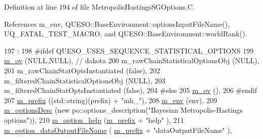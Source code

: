 Definition at line 194 of file Metropolis\-Hastings\-S\-G\-Options.\-C.



References m\-\_\-env, Q\-U\-E\-S\-O\-::\-Base\-Environment\-::options\-Input\-File\-Name(), U\-Q\-\_\-\-F\-A\-T\-A\-L\-\_\-\-T\-E\-S\-T\-\_\-\-M\-A\-C\-R\-O, and Q\-U\-E\-S\-O\-::\-Base\-Environment\-::world\-Rank().


\begin{DoxyCode}
197   :
198 \textcolor{preprocessor}{#ifdef QUESO\_USES\_SEQUENCE\_STATISTICAL\_OPTIONS}
199 \textcolor{preprocessor}{}  \hyperlink{class_q_u_e_s_o_1_1_metropolis_hastings_s_g_options_a9d4792d9fc2dc5439b8ab489b0c236eb}{m\_ov}                                               (NULL,NULL), \textcolor{comment}{// dakota}
200   m\_rawChainStatisticalOptionsObj                    (NULL),
201   m\_rawChainStatOptsInstantiated                     (\textcolor{keyword}{false}),
202   m\_filteredChainStatisticalOptionsObj               (NULL),
203   m\_filteredChainStatOptsInstantiated                (\textcolor{keyword}{false}),
204 \textcolor{preprocessor}{#else}
205 \textcolor{preprocessor}{}  \hyperlink{class_q_u_e_s_o_1_1_metropolis_hastings_s_g_options_a9d4792d9fc2dc5439b8ab489b0c236eb}{m\_ov}                                               (),
206 \textcolor{preprocessor}{#endif}
207 \textcolor{preprocessor}{}  \hyperlink{class_q_u_e_s_o_1_1_metropolis_hastings_s_g_options_a4f7c510aaa530336d24259e2a89f5d0b}{m\_prefix}                                           ((std::string)(prefix) + \textcolor{stringliteral}{"mh\_"}),
208   \hyperlink{class_q_u_e_s_o_1_1_metropolis_hastings_s_g_options_a328a978b771885e14d536272ff4aa9ef}{m\_env}                                              (env),
209   \hyperlink{class_q_u_e_s_o_1_1_metropolis_hastings_s_g_options_a1a2cf22fbccd0bac761d9ee610edc16f}{m\_optionsDesc}                                      (\textcolor{keyword}{new} po::options\_description(\textcolor{stringliteral}{"Bayesian
       Metropolis-Hastings options"})),
210   \hyperlink{class_q_u_e_s_o_1_1_metropolis_hastings_s_g_options_af73e79036b108974843e26bc036c70ce}{m\_option\_help}                                      (\hyperlink{class_q_u_e_s_o_1_1_metropolis_hastings_s_g_options_a4f7c510aaa530336d24259e2a89f5d0b}{m\_prefix} + \textcolor{stringliteral}{"help"}               
                             ),
211   \hyperlink{class_q_u_e_s_o_1_1_metropolis_hastings_s_g_options_ae5efdb40f8282073ebcad5892af4be44}{m\_option\_dataOutputFileName}                        (
      \hyperlink{class_q_u_e_s_o_1_1_metropolis_hastings_s_g_options_a4f7c510aaa530336d24259e2a89f5d0b}{m\_prefix} + \textcolor{stringliteral}{"dataOutputFileName"}                        ),

\end{DoxyCode}
